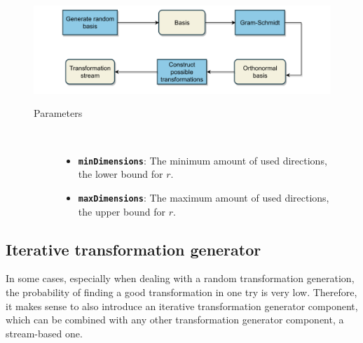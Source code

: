 \documentclass[
  a4paper,  %
  twoside,  %
  bibliography=totoc,
  headsepline,
  cleardoublepage=empty,
  parskip=half,
  draft=false
]{scrbook}
\begin{document}
\begin{mdframed}[style=style,frametitle={Transformation stream generator (random)}]
\begin{figure}[H]

\vspace{5px}
\includegraphics[width=\textwidth]{graphics/TransformationStreamGen_Random.pdf}
\delimit
\begin{description}
\item[Parameters] {~ \begin{itemize}[\indent{}]
\item \texttt{\textbf{minDimensions}}: The minimum amount of used directions, \ie the lower bound for $r$.
\item \texttt{\textbf{maxDimensions}}: The maximum amount of used directions, \ie the upper bound for $r$.
\end{itemize}}
\end{description}
\delimit
{}
\label{fig:rtsg}
\end{figure}
\end{mdframed}

\newpage

\subsection {Iterative transformation generator}

In some cases, especially when dealing with a random transformation generation, the probability of finding a good transformation in one try is very low.
Therefore, it makes sense to also introduce an iterative transformation generator component, which can be combined with any other transformation generator component, \eg a stream-based one.
\end{document}
